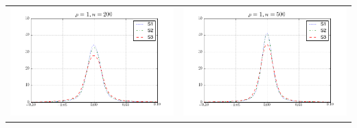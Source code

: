 \begin{table}[!ht]
{\begin{tabular}{c c}
\includegraphics[width=8cm]{theta_scaled_density_200_1} & \includegraphics[width=8cm]{theta_scaled_density_500_1} \\
\end{tabular}
}
\end{table}




